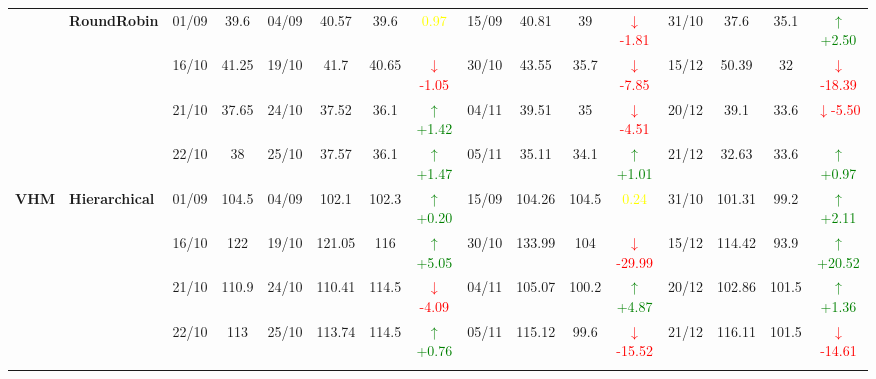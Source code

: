 \documentclass{ieeeaccess}
\begin{document}
{\begin{longtable}{llcc|cccc|cccc|cccc}
& \textbf{RoundRobin}
& 01/09 & 39.6 & 04/09 & 40.57 & 39.6 & \textcolor{yellow}{0.97} & 15/09 & 40.81 & 39 & \textcolor{red}{\(\downarrow\)-1.81} & 31/10 & 37.6 & 35.1 & \textcolor{green}{\(\uparrow\)+2.50} \\

&
& 16/10 & 41.25 & 19/10 & 41.7 & 40.65 & \textcolor{red}{\(\downarrow\)-1.05} & 30/10 & 43.55 & 35.7 & \textcolor{red}{\(\downarrow\)-7.85} & 15/12 & 50.39 & 32 & \textcolor{red}{\(\downarrow\)-18.39} \\

&
& 21/10 & 37.65 & 24/10 & 37.52 & 36.1 & \textcolor{green}{\(\uparrow\)+1.42} & 04/11 & 39.51 & 35 & \textcolor{red}{\(\downarrow\)-4.51} & 20/12 & 39.1 & 33.6 & \textcolor{red}{\(\downarrow\)-5.50} \\

&
& 22/10 & 38 & 25/10 & 37.57 & 36.1 & \textcolor{green}{\(\uparrow\)+1.47} & 05/11 & 35.11 & 34.1 & \textcolor{green}{\(\uparrow\)+1.01} & 21/12 & 32.63 & 33.6 & \textcolor{green}{\(\uparrow\)+0.97} \\
\midrule




\multirow{12}{*}{\textbf{VHM}} 
& \textbf{Hierarchical}
& 01/09 & 104.5 & 04/09 & 102.1 & 102.3 & \textcolor{green}{\(\uparrow\)+0.20} & 15/09 & 104.26 & 104.5 & \textcolor{yellow}{0.24} & 31/10 & 101.31 & 99.2 & \textcolor{green}{\(\uparrow\)+2.11} \\

&
& 16/10 & 122 & 19/10 & 121.05 & 116 & \textcolor{green}{\(\uparrow\)+5.05} & 30/10 & 133.99 & 104 & \textcolor{red}{\(\downarrow\)-29.99} & 15/12 & 114.42 & 93.9 & \textcolor{green}{\(\uparrow\)+20.52} \\

&
& 21/10 & 110.9 & 24/10 & 110.41 & 114.5 & \textcolor{red}{\(\downarrow\)-4.09} & 04/11 & 105.07 & 100.2 & \textcolor{green}{\(\uparrow\)+4.87} & 20/12 & 102.86 & 101.5 & \textcolor{green}{\(\uparrow\)+1.36} \\

&
& 22/10 & 113 & 25/10 & 113.74 & 114.5 & \textcolor{green}{\(\uparrow\)+0.76} & 05/11 & 115.12 & 99.6 & \textcolor{red}{\(\downarrow\)-15.52} & 21/12 & 116.11 & 101.5 & \textcolor{red}{\(\downarrow\)-14.61} \\
\cmidrule(lr){2-16}



\end{longtable}}
\end{document}
